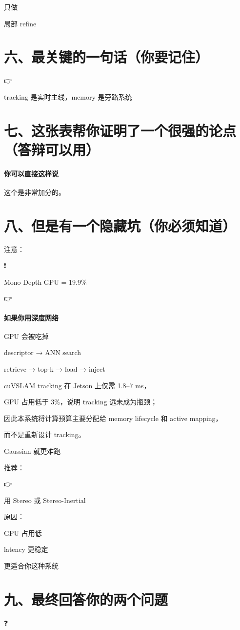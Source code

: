 \documentclass[12pt]{article}
\begin{document}
只做

局部 refine

\section{六、最关键的一句话（你要记住）}
👉

tracking 是实时主线，memory 是旁路系统

\section{七、这张表帮你证明了一个很强的论点（答辩可以用）}
\paragraph{你可以直接这样说}
这个是非常加分的。

\section{八、但是有一个隐藏坑（你必须知道）}
注意：

❗

Mono-Depth GPU = 19.9\%

👉

\paragraph{如果你用深度网络}
GPU 会被吃掉

descriptor → ANN search

retrieve → top-k → load → inject

cuVSLAM tracking 在 Jetson 上仅需 1.8–7 ms，

GPU 占用低于 3\%，说明 tracking 远未成为瓶颈；

因此本系统将计算预算主要分配给 memory lifecycle 和 active mapping，

而不是重新设计 tracking。

Gaussian 就更难跑

推荐：

👉

用 Stereo 或 Stereo-Inertial

原因：

GPU 占用低

latency 更稳定

更适合你这种系统

\section{九、最终回答你的两个问题}
❓
\end{document}
